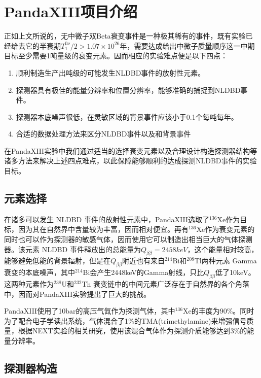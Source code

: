 
\chapter{PandaXIII项目介绍}
\label{chapter:intro}

正如上文所说的，无中微子双Beta衰变事件是一种极其稀有的事件，既有实验已经给去它的半衰期$T^{0\nu}_1/2>1.07\times10^{26}$年，需要达成给出中微子质量顺序这一中期目标至少需要1吨量级的衰变元素。因而相应的实验难点便是以下四点：
\begin{enumerate}
    \item 顺利制造生产出吨级的可能发生NLDBD事件的放射性元素。
    \item 探测器具有极佳的能量分辨率和位置分辨率，能够准确的捕捉到NLDBD事件。
    \item 探测器本底噪声很低，在灵敏区域的背景事件应该小于0.1个每吨每年。
    \item 合适的数据处理方法来区分NLDBD事件以及和背景事件
\end{enumerate}
在PandaXIII实验中我们通过适当的选择衰变元素以及合理设计构造探测器结构等诸多方法来解决上述四点难点，以此保障能够顺利的达成探测NLDBD事件的实验目标。

\section{元素选择}

在诸多可以发生 NLDBD 事件的放射性元素中，PandaXIII选取了$^{136}$Xe作为目标，因为其在自然界中含量较为丰富，因而相对便宜。再有$^{136}$Xe作为衰变元素的同时也可以作为探测器的敏感气体，因而使用它可以制造出相当巨大的气体探测器。该元素 NLDBD 事件释放出的总能量为$Q_{\beta\beta}=2458keV$，这个能量相对较高，能够避免低能的背景辐射，但是在$Q_{\beta\beta}$附近也有来自$^{214}$Bi和$^{208}$Tl两种元素 Gamma 衰变的本底噪声，其中$^{214}$Bi会产生2448keV的Gamma射线，只比$Q_{\beta\beta}$低了10keV。这两种元素作为$^{238}$U和$^{232}$Th
衰变链中的中间元素广泛存在于自然界的各个角落中，因而对PandaXIII实验提出了巨大的挑战。

PandaXIII使用了10bar的高压气氙作为探测气体，其中$^{136}$Xe的丰度为90\%。同时为了配合电子学读出系统，气体混合了1\%的TMA(trimethylamine)来增强信号质量，根据NEXT实验的相关研究，使用该混合气体作为探测介质能够达到3\%的能量分辨率\supercite{azevedoh2015accurate}。

\section{探测器构造}


